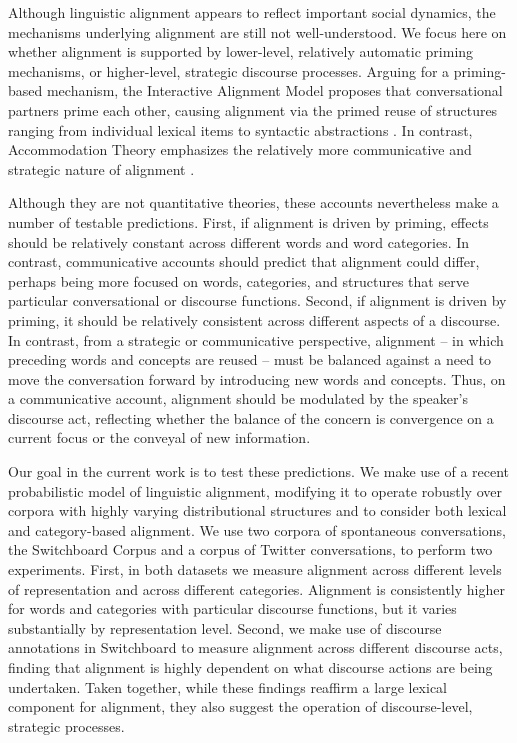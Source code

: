 \documentclass[11pt]{article}
\begin{document}
Although linguistic alignment appears to reflect important social dynamics, the mechanisms underlying alignment are still not well-understood. We focus here on whether alignment is supported by lower-level, relatively automatic priming mechanisms, or higher-level, strategic discourse processes. Arguing for a priming-based mechanism, the Interactive Alignment Model proposes that conversational partners prime each other, causing alignment via the primed reuse of structures ranging from individual lexical items to syntactic abstractions  \cite{PickeringGarrod2004}. In contrast, Accommodation Theory emphasizes the relatively more communicative and strategic nature of alignment \cite{GilesCouplandCoupland1991}.

Although they are not quantitative theories, these accounts nevertheless make a number of testable predictions. First, if alignment is driven by priming, effects should be relatively constant across different words and word categories. In contrast, communicative accounts should predict that alignment could differ, perhaps being more focused on words, categories, and structures that serve particular conversational or discourse functions. Second, if alignment is driven by priming, it should be relatively consistent across different aspects of a discourse. In contrast, from a strategic or communicative perspective, alignment -- in which preceding words and concepts are reused -- must be balanced against a need to move the conversation forward by introducing new words and concepts. Thus, on a communicative account, alignment should be modulated by the speaker's discourse act, reflecting whether the balance of the concern is convergence on a current focus or the conveyal of new information.

Our goal in the current work is to test these predictions. We make use of a recent probabilistic model of linguistic alignment, modifying it to operate robustly over corpora with highly varying distributional structures and to consider both lexical and category-based alignment. We use two corpora of spontaneous conversations, the Switchboard Corpus and a corpus of Twitter conversations, to perform two experiments. First, in both datasets we measure alignment across different levels of representation and across different categories. Alignment is consistently higher for words and categories with particular discourse functions, but it varies substantially by representation level.  Second, we make use of discourse annotations in Switchboard to measure alignment across different discourse acts, finding that alignment is highly dependent on what discourse actions are being undertaken. Taken together, while these findings reaffirm a large lexical component for alignment, they also suggest the operation of discourse-level, strategic processes.
\end{document}
